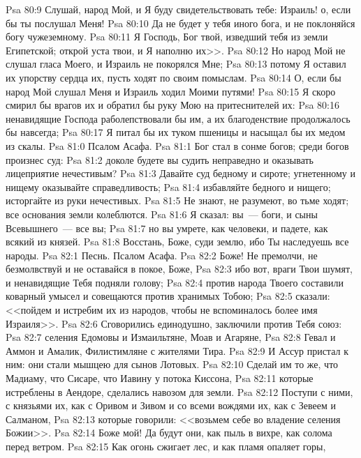 \vs Psa 80:9 Слушай, народ Мой, и Я буду свидетельствовать тебе: Израиль! о, если бы ты послушал Меня!
\vs Psa 80:10 Да не будет у тебя иного бога, и не поклоняйся богу чужеземному.
\vs Psa 80:11 Я Господь, Бог твой, изведший тебя из земли Египетской; открой уста твои, и Я наполню их>>.
\vs Psa 80:12 Но народ Мой не слушал гласа Моего, и Израиль не покорялся Мне;
\vs Psa 80:13 потому Я оставил их упорству сердца их, пусть ходят по своим помыслам.
\vs Psa 80:14 О, если бы народ Мой слушал Меня и Израиль ходил Моими путями!
\vs Psa 80:15 Я скоро смирил бы врагов их и обратил бы руку Мою на притеснителей их:
\vs Psa 80:16 ненавидящие Господа раболепствовали бы им, а их благоденствие продолжалось бы навсегда;
\vs Psa 80:17 Я питал бы их туком пшеницы и насыщал бы их медом из скалы.
\vs Psa 81:0 Псалом Асафа.
\rsbpar\vs Psa 81:1 Бог стал в сонме богов; среди богов произнес суд:
\vs Psa 81:2 доколе будете вы судить неправедно и оказывать лицеприятие нечестивым?
\vs Psa 81:3 Давайте суд бедному и сироте; угнетенному и нищему оказывайте справедливость;
\vs Psa 81:4 избавляйте бедного и нищего; исторгайте  из руки нечестивых.
\vs Psa 81:5 Не знают, не разумеют, во тьме ходят; все основания земли колеблются.
\vs Psa 81:6 Я сказал: вы~--- боги, и сыны Всевышнего~--- все вы;
\vs Psa 81:7 но вы умрете, как человеки, и падете, как всякий из князей.
\vs Psa 81:8 Восстань, Боже, суди землю, ибо Ты наследуешь все народы.
\vs Psa 82:1 Песнь. Псалом Асафа.
\rsbpar\vs Psa 82:2 Боже! Не премолчи, не безмолвствуй и не оставайся в покое, Боже,
\vs Psa 82:3 ибо вот, враги Твои шумят, и ненавидящие Тебя подняли голову;
\vs Psa 82:4 против народа Твоего составили коварный умысел и совещаются против хранимых Тобою;
\vs Psa 82:5 сказали: <<пойдем и истребим их из народов, чтобы не вспоминалось более имя Израиля>>.
\vs Psa 82:6 Сговорились единодушно, заключили против Тебя союз:
\vs Psa 82:7 селения Едомовы и Измаильтяне, Моав и Агаряне,
\vs Psa 82:8 Гевал и Аммон и Амалик, Филистимляне с жителями Тира.
\vs Psa 82:9 И Ассур пристал к ним: они стали мышцею для сынов Лотовых.
\vs Psa 82:10 Сделай им то же, что Мадиаму, что Сисаре, что Иавину у потока Киссона,
\vs Psa 82:11 которые истреблены в Аендоре, сделались навозом для земли.
\vs Psa 82:12 Поступи с ними, с князьями их, как с Оривом и Зивом и со всеми вождями их, как с Зевеем и Салманом,
\vs Psa 82:13 которые говорили: <<возьмем себе во владение селения Божии>>.
\vs Psa 82:14 Боже мой! Да будут они, как пыль в вихре, как солома перед ветром.
\vs Psa 82:15 Как огонь сжигает лес, и как пламя опаляет горы,
